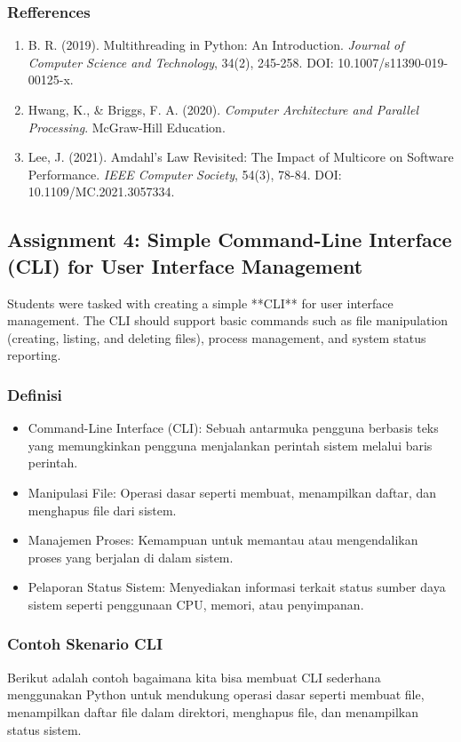 \documentclass[12pt]{article}
\begin{document}
	
	\subsubsection{Refferences}
	\begin{enumerate}
		\item B. R. (2019). Multithreading in Python: An Introduction. \textit{Journal of Computer Science and Technology}, 34(2), 245-258. DOI: 10.1007/s11390-019-00125-x.
		\item Hwang, K., \& Briggs, F. A. (2020). \textit{Computer Architecture and Parallel Processing}. McGraw-Hill Education.
		\item Lee, J. (2021). Amdahl’s Law Revisited: The Impact of Multicore on Software Performance. \textit{IEEE Computer Society}, 54(3), 78-84. DOI: 10.1109/MC.2021.3057334.
	\end{enumerate}
	
	
	\subsection{Assignment 4: Simple Command-Line Interface (CLI) for User Interface Management}
	Students were tasked with creating a simple **CLI** for user interface management. The CLI should support basic commands such as file manipulation (creating, listing, and deleting files), process management, and system status reporting.
	
	\subsubsection{Definisi}
	\begin{itemize}
		\item Command-Line Interface (CLI): Sebuah antarmuka pengguna berbasis teks yang memungkinkan pengguna menjalankan perintah sistem melalui baris perintah.
		\item Manipulasi File: Operasi dasar seperti membuat, menampilkan daftar, dan menghapus file dari sistem.
		\item Manajemen Proses: Kemampuan untuk memantau atau mengendalikan proses yang berjalan di dalam sistem.
		\item Pelaporan Status Sistem: Menyediakan informasi terkait status sumber daya sistem seperti penggunaan CPU, memori, atau penyimpanan.
	\end{itemize}
	
	\subsubsection{Contoh Skenario CLI}
	Berikut adalah contoh bagaimana kita bisa membuat CLI sederhana menggunakan Python untuk mendukung operasi dasar seperti membuat file, menampilkan daftar file dalam direktori, menghapus file, dan menampilkan status sistem.
	
\end{document}
